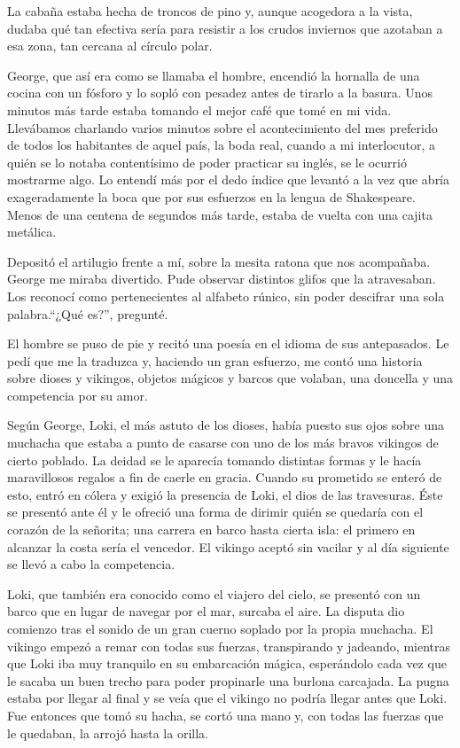 \documentclass[11pt,twoside,openright,a6paper]{book}
\begin{document}
La cabaña estaba hecha de troncos de pino y, aunque acogedora a la vista, dudaba qué tan efectiva sería para resistir a los crudos inviernos que azotaban a esa zona, tan cercana al círculo polar.

George, que así era como se llamaba el hombre, encendió la hornalla de una cocina con un fósforo y lo sopló con pesadez antes de tirarlo a la basura. Unos minutos más tarde estaba tomando el mejor café que tomé en mi vida. Llevábamos charlando varios minutos sobre el acontecimiento del mes preferido de todos los habitantes de aquel país, la boda real, cuando a mi interlocutor, a quién se lo notaba contentísimo de poder practicar su inglés, se le ocurrió mostrarme algo. Lo entendí más por el dedo índice que levantó a la vez que abría exageradamente la boca que por sus esfuerzos en la lengua de Shakespeare. Menos de una centena de segundos más tarde, estaba de vuelta con una cajita metálica.

Depositó el artilugio frente a mí, sobre la mesita ratona que nos acompañaba. George me miraba divertido. Pude observar distintos glifos que la atravesaban. Los reconocí como pertenecientes al alfabeto rúnico, sin poder descifrar una sola palabra.“¿Qué es?”, pregunté.

El hombre se puso de pie y recitó una poesía en el idioma de sus antepasados. Le pedí que me la traduzca y, haciendo un gran esfuerzo, me contó una historia sobre dioses y vikingos, objetos mágicos y barcos que volaban, una doncella y una competencia por su amor.

Según George, Loki, el más astuto de los dioses, había puesto sus ojos sobre una muchacha que estaba a punto de casarse con uno de los más bravos vikingos de cierto poblado. La deidad se le aparecía tomando distintas formas y le hacía maravillosos regalos a fin de caerle en gracia. Cuando su prometido se enteró de esto, entró en cólera y exigió la presencia de Loki, el dios de las travesuras. Éste se presentó ante él y le ofreció una forma de dirimir quién se quedaría con el corazón de la señorita; una carrera en barco hasta cierta isla: el primero en alcanzar la costa sería el vencedor. El vikingo aceptó sin vacilar y al día siguiente se llevó a cabo la competencia.

Loki, que también era conocido como el viajero del cielo, se presentó con un barco que en lugar de navegar por el mar, surcaba el aire. La disputa dio comienzo tras el sonido de un gran cuerno soplado por la propia muchacha. El vikingo empezó a remar con todas sus fuerzas, transpirando y jadeando, mientras que Loki iba muy tranquilo en su embarcación mágica, esperándolo cada vez que le sacaba un buen trecho para poder propinarle una burlona carcajada. La pugna estaba por llegar al final y se veía que el vikingo no podría llegar antes que Loki. Fue entonces que tomó su hacha, se cortó una mano y, con todas las fuerzas que le quedaban, la arrojó hasta la orilla.
\end{document}
